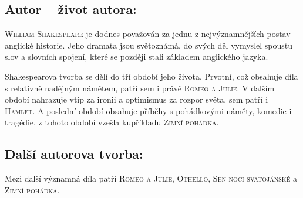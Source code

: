 \documentclass[A4paper]{extarticle} %
\begin{document}


\subsection*{Autor {\ssmall -- život autora:}}
\noindent 
\textsc{William Shakespeare} je dodnes považován za jednu z nejvýznamnějších postav anglické historie.
Jeho dramata jsou světoznámá, do svých děl vymyslel spoustu slov a slovních spojení, které se později stali základem anglického jazyka. \par
Shakespearova tvorba se dělí do tří období jeho života.
Prvotní, což obsahuje díla s relativně nadějným námětem, patří sem i právě \textsc{Romeo a Julie}.
V dalším období nahrazuje vtip za ironii a optimismus za rozpor světa, sem patří i \textsc{Hamlet}.
A poslední období obsahuje příběhy s pohádkovými náměty, komedie i tragédie, z tohoto období vzešla kupříkladu \textsc{Zimní pohádka}.


\subsection*{Další autorova tvorba:}
\noindent 
Mezi další významná díla patří \textsc{Romeo a Julie}, \textsc{Othello}, \textsc{Sen noci svatojánské} a \textsc{Zimní pohádka}.



\end{document}
